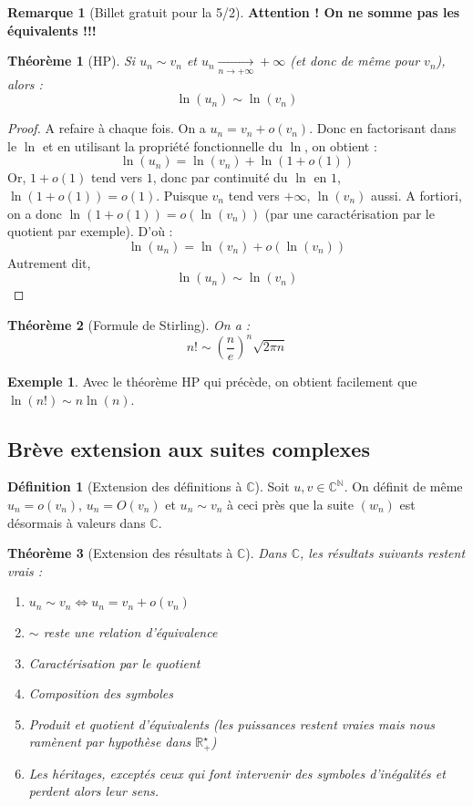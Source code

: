 \documentclass[french]{book}
\newcommand{\N}{\mathbb{N}}
\newcommand{\R}{\mathbb{R}}
\newcommand{\C}{\mathbb{C}}
\newcommand{\st}{^\star}
\theoremstyle{plain}
\newtheorem{thm}{Théorème}[chapter]
\theoremstyle{definition}
\newtheorem{dfn}{Définition}[chapter]
\newtheorem{exa}{Exemple}[chapter]
\newtheorem{rmq}{Remarque}[chapter]
\theoremstyle{remark}
\begin{document}
\begin{rmq}[Billet gratuit pour la 5/2]
	\textbf{Attention ! On ne somme pas les équivalents !!!}
\end{rmq}
\begin{thm}[HP]
	Si $u_n\sim v_n$ et $u_n\xrightarrow[n\to+\infty]{}+\infty$ (et donc de même pour $v_n$), alors : $$\ln(u_n)\sim\ln(v_n)$$
\end{thm}
\begin{proof}
	A refaire à chaque fois. On a $u_n=v_n+o(v_n)$. Donc en factorisant dans le $\ln$ et en utilisant la propriété fonctionnelle du $\ln$, on obtient : $$\ln(u_n)=\ln(v_n)+\ln(1+o(1))$$ Or, $1+o(1)$ tend vers $1$, donc par continuité du $\ln$ en $1$, $\ln(1+o(1))=o(1)$. Puisque $v_n$ tend vers $+\infty$, $\ln(v_n)$ aussi. A fortiori, on a donc $\ln(1+o(1))=o(\ln(v_n))$ (par une caractérisation par le quotient par exemple). D'où : $$\ln(u_n)=\ln(v_n)+o(\ln(v_n))$$ Autrement dit, $$\ln(u_n)\sim\ln(v_n)$$
\end{proof}
\begin{thm}[Formule de Stirling]
	On a :$$n!\sim \left(\frac{n}{e}\right)^n\sqrt{2\pi n}$$
\end{thm}
\begin{exa}
	Avec le théorème HP qui précède, on obtient facilement que $\ln(n!)\sim n\ln(n)$.
\end{exa}
\subsection{Brève extension aux suites complexes}
\begin{dfn}[Extension des définitions à $\C$]
	Soit $u,v\in\C^\N$. On définit de même $u_n=o(v_n)$, $u_n=O(v_n)$ et $u_n\sim v_n$ à ceci près que la suite $(w_n)$ est désormais à valeurs dans $\C$.
\end{dfn}
\begin{thm}[Extension des résultats à $\C$]
	Dans $\C$, les résultats suivants restent vrais :
	\begin{enumerate}
		\item $u_n\sim v_n \Longleftrightarrow u_n=v_n+o(v_n)$
		\item $\sim$ reste une relation d'équivalence
		\item Caractérisation par le quotient
		\item Composition des symboles
		\item Produit et quotient d'équivalents (les puissances restent vraies mais nous ramènent par hypothèse dans $\R_+\st$)
		\item Les héritages, exceptés ceux qui font intervenir des symboles d'inégalités et perdent alors leur sens.
	\end{enumerate}
\end{thm}
\end{document}
